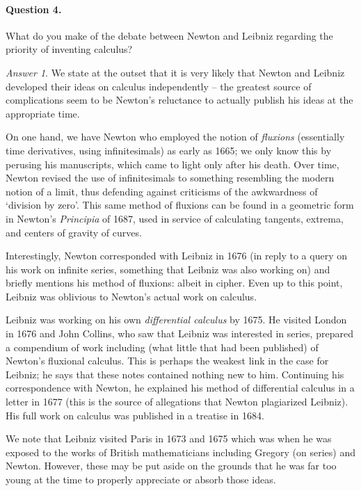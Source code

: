\documentclass[11pt]{article}
\theoremstyle{remark}
\newtheorem*{answer}{Answer}
\begin{document}
    \paragraph{Question 4.} What do you make of the debate between Newton and
    Leibniz regarding the priority of inventing calculus?

    \begin{answer}
        We state at the outset that it is very likely that Newton and Leibniz
        developed their ideas on calculus independently -- the greatest source of
        complications seem to be Newton's reluctance to actually publish his ideas at
        the appropriate time.

        On one hand, we have Newton who employed the notion of \emph{fluxions}
        (essentially time derivatives, using infinitesimals) as early as 1665; we
        only know this by perusing his manuscripts, which came to light only after
        his death. Over time, Newton revised the use of infinitesimals to something
        resembling the modern notion of a limit, thus defending against criticisms of
        the awkwardness of `division by zero'. This same method of fluxions can be
        found in a geometric form in Newton's \emph{Principia} of 1687, used in
        service of calculating tangents, extrema, and centers of gravity of curves.

        Interestingly, Newton corresponded with Leibniz in 1676 (in reply to a query
        on his work on infinite series, something that Leibniz was also working on)
        and briefly mentions his method of fluxions: albeit in cipher. Even up to
        this point, Leibniz was oblivious to Newton's actual work on calculus.

        Leibniz was working on his own \emph{differential calculus} by 1675. He
        visited London in 1676 and John Collins, who saw that Leibniz was interested
        in series, prepared a compendium of work including (what little that had been
        published) of Newton's fluxional calculus. This is perhaps the weakest link
        in the case for Leibniz; he says that these notes contained nothing new to
        him. Continuing his correspondence with Newton, he explained his method of
        differential calculus in a letter in 1677 (this is the source of allegations
        that Newton plagiarized Leibniz). His full work on calculus was published in
        a treatise in 1684.

        We note that Leibniz visited Paris in 1673 and 1675 which was when he was
        exposed to the works of British mathematicians including Gregory (on series)
        and Newton. However, these may be put aside on the grounds that he was far
        too young at the time to properly appreciate or absorb those ideas.


\end{answer}
\end{document}
